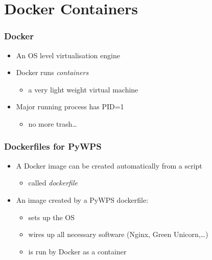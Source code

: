 \documentclass{beamer}
\begin{document}
\section{Docker Containers}

\begin{frame}
\frametitle<presentation>{Docker}


\begin{itemize}
  \item An OS level virtualisation engine
  \item Docker runs \textit{containers}
  \begin{itemize} \item a very light weight virtual machine \end{itemize}
  \item Major running process has PID=1
   \begin{itemize}
	  \item no more trash\ldots
	\end{itemize}
\end{itemize}

\end{frame}

\begin{frame}
\frametitle<presentation>{Dockerfiles for PyWPS}

\begin{itemize}
  \item A Docker image can be created automatically from a script
   \begin{itemize} \item called \textit{dockerfile} \end{itemize}
  \item An image created by a PyWPS dockerfile: 
  \begin{itemize} 
    \item sets up the OS 
    \item wires up all necessary software (Nginx, Green Unicorn,\ldots)
    \item is run by Docker as a container   
  \end{itemize}
\end{itemize}

\end{frame}
\end{document}
